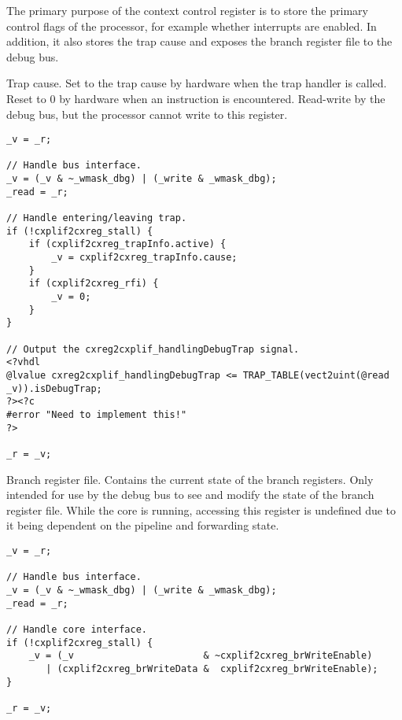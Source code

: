 

The primary purpose of the context control register is to store the primary
control flags of the processor, for example whether interrupts are enabled. In
addition, it also stores the trap cause and exposes the branch register file to
the debug bus.

Trap cause. Set to the trap cause by hardware when the trap handler is called. 
Reset to 0 by hardware when an  instruction is encountered. Read-write 
by the debug bus, but the processor cannot write to this register.

\declaration{}
\implementation{}
\begin{lstlisting}
_v = _r;

// Handle bus interface.
_v = (_v & ~_wmask_dbg) | (_write & _wmask_dbg);
_read = _r;

// Handle entering/leaving trap.
if (!cxplif2cxreg_stall) {
    if (cxplif2cxreg_trapInfo.active) {
        _v = cxplif2cxreg_trapInfo.cause;
    }
    if (cxplif2cxreg_rfi) {
        _v = 0;
    }
}

// Output the cxreg2cxplif_handlingDebugTrap signal.
<?vhdl
@lvalue cxreg2cxplif_handlingDebugTrap <= TRAP_TABLE(vect2uint(@read _v)).isDebugTrap;
?><?c
#error "Need to implement this!"
?>

_r = _v;
\end{lstlisting}

Branch register file. Contains the current state of the branch registers. Only
intended for use by the debug bus to see and modify the state of the branch
register file. While the core is running, accessing this register is undefined
due to it being dependent on the pipeline and forwarding state.

\declaration{}
\implementation{}
\begin{lstlisting}
_v = _r;

// Handle bus interface.
_v = (_v & ~_wmask_dbg) | (_write & _wmask_dbg);
_read = _r;

// Handle core interface.
if (!cxplif2cxreg_stall) {
    _v = (_v                       & ~cxplif2cxreg_brWriteEnable)
       | (cxplif2cxreg_brWriteData &  cxplif2cxreg_brWriteEnable);
}

_r = _v;
\end{lstlisting}

